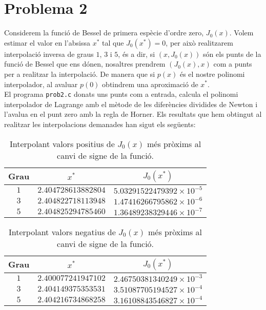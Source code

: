 \documentclass[12pt]{article}
\begin{document}
\newpage
	\section*{Problema 2}
	Considerem la funció de Bessel de primera espècie d'ordre zero, $J_0(x)$. Volem estimar el valor en l'absissa $x^*$ tal que $J_0(x^*)=0$, per això realitzarem interpolació inversa de graus $1$, $3$ i $5$, és a dir, si $(x, J_0(x))$ són els punts de la funció de Bessel que ens dónen, nosaltres prendrem $(J_0(x), x)$ com a punts per a realitzar la interpolació. De manera que si $p(x)$ és el nostre polinomi interpolador, al avaluar $p(0)$ obtindrem una aproximació de $x^*$.\\
	
	El programa \texttt{prob2.c} donats uns punts com a entrada, calcula el polinomi interpolador de Lagrange amb el mètode de les diferències dividides de Newton i l'avalua en el punt zero amb la regla de Horner. Els resultats que hem obtingut al realitzar les interpolacions demanades han sigut els següents:
	
	\begin{table}[h!]
		\centering
		\caption{Interpolant valors positius de $J_0(x)$ més pròxims al canvi de signe de la funció.}	
		\begin{tabular}{c|c|c}
			Grau & $x^*$ &$J_0(x^*)$\\
			\hline
			\hline
			$1$ & $2.404728613882804$  &$5.03291522479392\times10^{-5}$\\
			$3$ & $2.404822718113948$ &$1.47416266795862\times10^{-6}$\\
			$5$ & $2.404825294785460$ &$1.36489238329446\times10^{-7}$\\
		\end{tabular}
	\end{table}
	
	\begin{table}[h!]
		\centering
		\caption{Interpolant valors negatius de $J_0(x)$ més pròxims al canvi de signe de la funció.}	
		\begin{tabular}{c|c|c}
			Grau & $x^*$ &$J_0(x^*)$\\
			\hline
			\hline
			$1$ & $2.400077241947102$&$2.46750381340249\times10^{-3}$\\
			$3$ & $2.404149375353531$&$3.51087705194527\times10^{-4}$\\
			$5$ &$2.404216734868258$ &$3.16108843546827\times10^{-4}$\\
		\end{tabular}
	\end{table}
	
\end{document}
